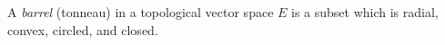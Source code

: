 A \textit{barrel} (tonneau) in a topological vector space $E$ is a subset which is radial, convex, circled, and closed.
